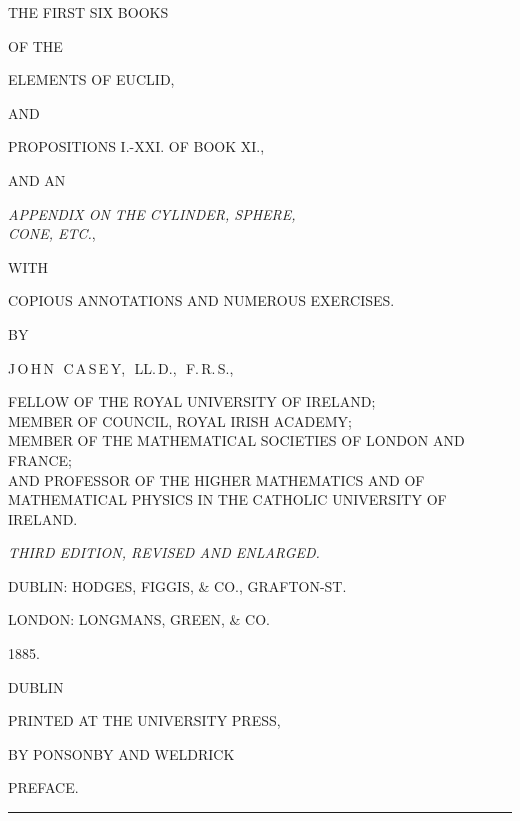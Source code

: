 \documentclass[oneside]{book}
\newcommand\imgcent[2]{
\begin{center}
\end{center}
}
\begin{document}
\newpage
\begin{center}

{\LARGE THE FIRST SIX BOOKS}\bigskip

{\small OF THE}\bigskip

{\Huge ELEMENTS OF EUCLID,}\bigskip

{\small AND}\bigskip

{\Large PROPOSITIONS I.-XXI\@. OF BOOK XI\@.,}\bigskip

{\small AND AN}\bigskip

{\Large \textit{APPENDIX ON THE CYLINDER, SPHERE,\\
CONE, E{\normalsize TC.}},}\bigskip

{\small WITH}\bigskip

COPIOUS ANNOTATIONS AND NUMEROUS EXERCISES.\bigskip

{\small BY}\medskip

{\LARGE J\,O\,H\,N\, \,C\,A\,S\,E\,Y,\, \,LL\@.\,D.,\, \,F.\,R.\,S.,}\medskip

{\small FELLOW OF THE ROYAL UNIVERSITY OF IRELAND;\\
MEMBER OF COUNCIL, ROYAL IRISH ACADEMY;\\
MEMBER OF THE MATHEMATICAL SOCIETIES OF LONDON AND FRANCE;\\
AND PROFESSOR OF THE HIGHER MATHEMATICS AND OF\\
MATHEMATICAL PHYSICS IN THE CATHOLIC UNIVERSITY OF IRELAND.}\bigskip

\imgcent{144}{f000}

\bigskip

\textit{THIRD EDITION, REVISED AND ENLARGED.}\smallskip

DUBLIN: HODGES, FIGGIS, \& CO., GRAFTON-ST.

LONDON: LONGMANS, GREEN, \& CO.

1885.

\end{center}


\newpage

\begin{center}
DUBLIN\medskip

PRINTED AT THE UNIVERSITY PRESS,\medskip

BY PONSONBY AND WELDRICK
\end{center}


\newpage
\frontmatter
\pagestyle{plain}


\begin{center}
{\LARGE PREFACE.}

\bigskip

\rule[1ex]{1.5cm}{.2pt}

\bigskip

\end{center}
\end{document}
